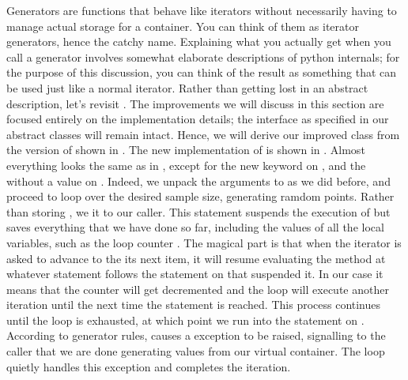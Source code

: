 Generators are functions that behave like iterators without necessarily having to manage actual
storage for a container. You can think of them as iterator generators, hence the catchy name.
Explaining what you actually get when you call a generator involves somewhat elaborate
descriptions of python internals; for the purpose of this discussion, you can think of the
result as something that can be used just like a normal iterator. Rather than getting lost in
an abstract description, let's revisit . The improvements we will
discuss in this section are focused entirely on the implementation details; the interface as
specified in our abstract classes will remain intact. Hence, we will derive our improved class
from the version of  shown in . The new
implementation of  is shown in .
%
%
Almost everything looks the same as in , except for the new
keyword  on , and the  without a
value on . Indeed, we unpack the arguments to 
as we did before, and proceed to loop over the desired sample size, generating ramdom points.
Rather than storing , we  it to our caller. This statement
suspends the execution of  but saves everything that we have done so far,
including the values of all the local variables, such as the loop counter . The
magical part is that when the iterator is asked to advance to the its next item, it will resume
evaluating the method  at whatever statement follows the 
statement on  that suspended it. In our case it means that the
counter will get decremented and the loop will execute another iteration until the next time
the  statement is reached. This process continues until the loop is exhausted,
at which point we run into the  statement on
. According to generator rules,  causes a
 exception to be raised, signalling to the caller that we are done
generating values from our virtual container. The  loop quietly handles this
exception and completes the iteration.

